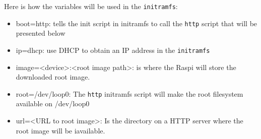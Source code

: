 Here is how the variables will be used in the \texttt{initramfs}:
\begin{itemize}
    \item boot=http: tells the init script in initramfs to call the \texttt{http} script that will be presented below
    \item ip=dhcp: use \ac{DHCP} to obtain an \ac{IP} address in the \texttt{initramfs}
    \item image=<device>:<root image path>: is where the \ac{Raspi} will store the downloaded root image.
    \item root=/dev/loop0: The \texttt{http} initramfs script will make the root filesystem available on /dev/loop0
    \item url=<URL to root image>: Is the directory on a \ac{HTTP} server where the root image will be iavailable.
\end{itemize}






